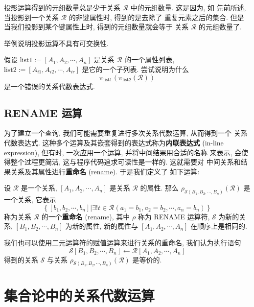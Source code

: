 \documentclass[10pt,UTF8]{book} %
\begin{document}
投影运算得到的元组数量总是少于关系 $\mathcal{R}$ 中的元组数量. 这是因为, 如
先前所述, 当投影到一个关系 $\mathcal{R}$ 的非键属性时, 得到的是去除了
重复元素之后的集合. 但是当我们投影到某个键属性上时, 得到的元组数量就会等于
关系 $\mathcal{R}$ 的元组数量了.

\begin{exercise}
    举例说明投影运算不具有可交换性.
\end{exercise}
\begin{exercise}
    假设 $\mathrm{list1} := [A_1, A_2, \cdots, A_n]$ 是关系 $\mathcal{R}$ 的一个属性列表,
    $\mathrm{list2} := [A_{i1}, A_{i2}, \cdots, A_{ir}]$ 是它的一个子列表.
    尝试说明为什么
    \[ \pi_\mathrm{list1}\left(\pi_\mathrm{list2}(\mathcal{R})\right) \]
    是一个错误的关系代数表达式.
\end{exercise}

\subsection{RENAME 运算}

为了建立一个查询, 我们可能需要重复进行多次关系代数运算, 从而得到一个
关系代数表达式. 这种多个运算及其嵌套得到的表达式称为\textbf{内联表达式}
(in-line expression), 但有时, 一次应用一个运算, 并将中间结果用合适的名称
来表示, 会使得整个过程更简洁, 这与程序代码追求可读性是一样的. 这就需要对
中间关系和结果关系及其属性进行\textbf{重命名} (rename). 于是我们定义了
如下运算:

\begin{definition}[重命名运算]
    设 $\mathcal{R}$ 是一个关系, $[A_1, A_2, \cdots, A_n]$ 是关系
    $\mathcal{R}$ 的属性. 那么 $\rho_{\mathcal{S}(B_1, B_2, \cdots, B_n)}(\mathcal{R})$
    是一个关系, 它表示
    \[ 
    \left\{
        [b_1, b_2, \cdots, b_n] | \exists! t \in \mathcal{R}
        \left( a_1 = b_1, a_2=b_2, \cdots, a_n = b_n \right)
    \right\} \]
    称为关系 $\mathcal{R}$ 的一个\textbf{重命名} (rename),
    其中 $\rho$ 称为 RENAME 运算符,
    $\mathcal{S}$ 为新的关系, $[B_1, B_2, \cdots, B_n]$ 为新的属性,
    新的属性与 $[A_1, A_2, \cdots, A_n]$ 在顺序上是相同的.
\end{definition}

我们也可以使用二元运算符的赋值运算来进行关系的重命名, 我们认为执行语句
\[ \mathcal{S}[B_1, B_2, \cdots, B_n] \longleftarrow 
\mathcal{R}[A_1, A_2, \cdots, A_n] \]
得到的关系 $\mathcal{S}$ 与关系 
$\rho_{\mathcal{S}(B_1, B_2, \cdots, B_n)}(\mathcal{R})$
是等价的.

\section{集合论中的关系代数运算}
\end{document}
